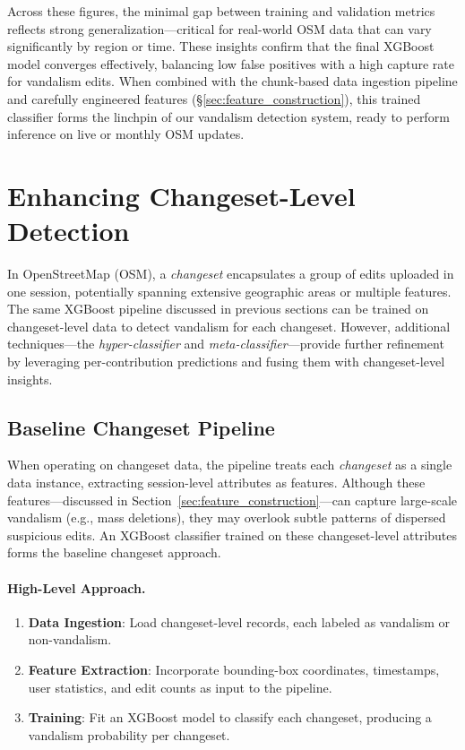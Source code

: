 \documentclass[
    13pt, %
    a4paper, %
    listof=totoc, %
    bibliography=totoc, %
    index=totoc, %
    headsepline
]{scrreprt}
\begin{document}
Across these figures, the minimal gap between training and validation metrics reflects strong
generalization—critical for real-world OSM data that can vary significantly by region or time.
These insights confirm that the final XGBoost model converges effectively, balancing low false
positives with a high capture rate for vandalism edits. When combined with the chunk-based data ingestion pipeline and carefully engineered features (\S\ref{sec:feature_construction}), this trained classifier forms
the linchpin of our vandalism detection system, ready to perform inference on live or monthly
OSM updates.


\newpage
\section{Enhancing Changeset-Level Detection}
\label{sec:changeset_level_detection}

In OpenStreetMap (OSM), a \emph{changeset} encapsulates a group of edits uploaded in one session, potentially spanning extensive geographic areas or multiple features. The same XGBoost pipeline discussed in previous sections can be trained on changeset-level data to detect vandalism for each changeset. However, additional techniques—the \emph{hyper-classifier} and \emph{meta-classifier}—provide further refinement by leveraging per-contribution predictions and fusing them with changeset-level insights.

\subsection{Baseline Changeset Pipeline}
\label{subsec:baseline_changeset_pipeline}

When operating on changeset data, the pipeline treats each \emph{changeset} as a single data instance, extracting session-level attributes as features. Although these features—discussed in Section~\ref{sec:feature_construction}—can capture large-scale vandalism (e.g., mass deletions), they may overlook subtle patterns of dispersed suspicious edits. An XGBoost classifier trained on these changeset-level attributes forms the baseline changeset approach.

\paragraph{High-Level Approach.}
\begin{enumerate}
    \item \textbf{Data Ingestion}: Load changeset-level records, each labeled as vandalism or non-vandalism.
    \item \textbf{Feature Extraction}: Incorporate bounding-box coordinates, timestamps, user statistics, and edit counts as input to the pipeline.
    \item \textbf{Training}: Fit an XGBoost model to classify each changeset, producing a vandalism probability per changeset.
\end{enumerate}
\end{document}
